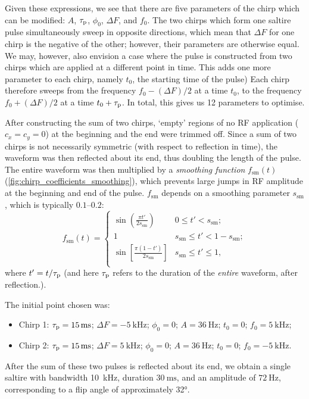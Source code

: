 Given these expressions, we see that there are five parameters of the chirp which can be modified: $A$, $\tau_\mathrm{p}$, $\phi_0$, $\Delta F$, and $f_0$.
The two chirps which form one saltire pulse simultaneously sweep in opposite directions, which mean that $\Delta F$ for one chirp is the negative of the other; however, their parameters are otherwise equal.
We may, however, also envision a case where the pulse is constructed from two chirps which are applied at a different point in time.
This adds one more parameter to each chirp, namely $t_0$, the starting time of the pulse)
Each chirp therefore sweeps from the frequency $f_0 - (\Delta F)/2$ at a time $t_0$, to the frequency $f_0 + (\Delta F)/2$ at a time $t_0 + \tau_\mathrm{p}$.
In total, this gives us 12 parameters to optimise.\autocite{Foroozandeh2020JMR,Verstraete2022JMR}

After constructing the sum of two chirps, `empty' regions of no RF application ($c_x = c_y = 0$) at the beginning and the end were trimmed off.
Since a sum of two chirps is not necessarily symmetric (with respect to reflection in time), the waveform was then reflected about its end, thus doubling the length of the pulse.
The entire waveform was then multiplied by a \textit{smoothing function} $f_\text{sm}(t)$ (\cref{fig:chirp_coefficients_smoothing}), which prevents large jumps in RF amplitude at the beginning and end of the pulse.
$f_\text{sm}$ depends on a smoothing parameter $s_\text{sm}$, which is typically $0.1$--$0.2$:
\begin{equation}
    \label{eq:sming_function}
    f_\text{sm}(t) = \begin{cases}
        \displaystyle \sin\left(\frac{\pi t'}{2 s_\text{sm}}\right) & 0 \leq t' < s_\text{sm}; \\
        \displaystyle 1 & s_\text{sm} \leq t' < 1 - s_\text{sm}; \\
        \displaystyle \sin\left[\frac{\pi (1 - t')}{2 s_\text{sm}}\right] & s_\text{sm} \leq t' \leq 1, \\
    \end{cases}
\end{equation}
where $t' = t/\tau_\mathrm{p}$ (and here $\tau_\mathrm{p}$ refers to the duration of the \textit{entire} waveform, after reflection.).

The initial point chosen was:
\begin{itemize}
    \item Chirp 1: $\taup = \SI{15}{\ms}$; $\Delta F = \SI{-5}{\kHz}$; $\phi_0 = 0$; $A = \SI{36}{\Hz}$; $t_0 = 0$; $f_0 = \SI{5}{\kHz}$;
    \item Chirp 2: $\taup = \SI{15}{\ms}$; $\Delta F = \SI{5}{\kHz}$; $\phi_0 = 0$; $A = \SI{36}{\Hz}$; $t_0 = 0$; $f_0 = \SI{-5}{\kHz}$.
\end{itemize}
After the sum of these two pulses is reflected about its end, we obtain a single saltire with bandwidth \SI{10}{\kHz}, duration $\SI{30}{\ms}$, and an amplitude of $\SI{72}{\Hz}$, corresponding to a flip angle of approximately \ang{32}.

